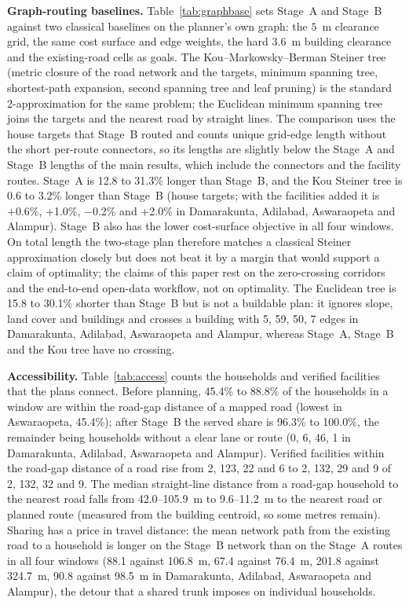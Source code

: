 \documentclass[10pt,a4paper,twocolumn]{article}
\begin{document}
\textbf{Graph-routing baselines.} Table~\ref{tab:graphbase} sets Stage~A and Stage~B against two classical baselines on the planner's own graph: the $5$~m clearance grid, the same cost surface and edge weights, the hard $3.6$~m building clearance and the existing-road cells as goals. The Kou--Markowsky--Berman Steiner tree \cite{kou1981steiner} (metric closure of the road network and the targets, minimum spanning tree, shortest-path expansion, second spanning tree and leaf pruning) is the standard 2-approximation for the same problem; the Euclidean minimum spanning tree joins the targets and the nearest road by straight lines. The comparison uses the house targets that Stage~B routed and counts unique grid-edge length without the short per-route connectors, so its lengths are slightly below the Stage~A and Stage~B lengths of the main results, which include the connectors and the facility routes. Stage~A is 12.8 to 31.3\% longer than Stage~B, and the Kou Steiner tree is 0.6 to 3.2\% longer than Stage~B (house targets; with the facilities added it is +0.6\%, +1.0\%, $-$0.2\% and +2.0\% in Damarakunta, Adilabad, Aswaraopeta and Alampur). Stage~B also has the lower cost-surface objective in all four windows. On total length the two-stage plan therefore matches a classical Steiner approximation closely but does not beat it by a margin that would support a claim of optimality; the claims of this paper rest on the zero-crossing corridors and the end-to-end open-data workflow, not on optimality. The Euclidean tree is 15.8 to 30.1\% shorter than Stage~B but is not a buildable plan: it ignores slope, land cover and buildings and crosses a building with 5, 59, 50, 7 edges in Damarakunta, Adilabad, Aswaraopeta and Alampur, whereas Stage~A, Stage~B and the Kou tree have no crossing.

\textbf{Accessibility.} Table~\ref{tab:access} counts the households and verified facilities that the plans connect. Before planning, 45.4\% to 88.8\% of the households in a window are within the road-gap distance of a mapped road (lowest in Aswaraopeta, 45.4\%); after Stage~B the served share is 96.3\% to 100.0\%, the remainder being households without a clear lane or route (0, 6, 46, 1 in Damarakunta, Adilabad, Aswaraopeta and Alampur). Verified facilities within the road-gap distance of a road rise from 2, 123, 22 and 6 to 2, 132, 29 and 9 of 2, 132, 32 and 9. The median straight-line distance from a road-gap household to the nearest road falls from 42.0--105.9~m to 9.6--11.2~m to the nearest road or planned route (measured from the building centroid, so some metres remain). Sharing has a price in travel distance: the mean network path from the existing road to a household is longer on the Stage~B network than on the Stage~A routes in all four windows (88.1 against 106.8~m, 67.4 against 76.4~m, 201.8 against 324.7~m, 90.8 against 98.5~m in Damarakunta, Adilabad, Aswaraopeta and Alampur), the detour that a shared trunk imposes on individual households.
\end{document}
